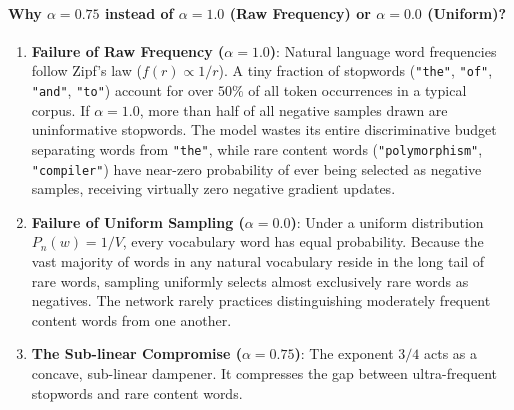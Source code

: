 \documentclass[../../main.tex]{subfiles}
\begin{document}
\paragraph{Why $\alpha = 0.75$ instead of $\alpha = 1.0$ (Raw Frequency) or $\alpha = 0.0$ (Uniform)?}
\begin{enumerate}
    \item \textbf{Failure of Raw Frequency ($\alpha = 1.0$)}: Natural language word frequencies follow Zipf's law ($f(r) \propto 1/r$). A tiny fraction of stopwords (\texttt{"the"}, \texttt{"of"}, \texttt{"and"}, \texttt{"to"}) account for over $50\%$ of all token occurrences in a typical corpus. If $\alpha = 1.0$, more than half of all negative samples drawn are uninformative stopwords. The model wastes its entire discriminative budget separating words from \texttt{"the"}, while rare content words (\texttt{"polymorphism"}, \texttt{"compiler"}) have near-zero probability of ever being selected as negative samples, receiving virtually zero negative gradient updates.
    
    \item \textbf{Failure of Uniform Sampling ($\alpha = 0.0$)}: Under a uniform distribution $P_n(w) = 1/V$, every vocabulary word has equal probability. Because the vast majority of words in any natural vocabulary reside in the long tail of rare words, sampling uniformly selects almost exclusively rare words as negatives. The network rarely practices distinguishing moderately frequent content words from one another.
    
    \item \textbf{The Sub-linear Compromise ($\alpha = 0.75$)}: The exponent $3/4$ acts as a concave, sub-linear dampener. It compresses the gap between ultra-frequent stopwords and rare content words.
\end{enumerate}
\end{document}
